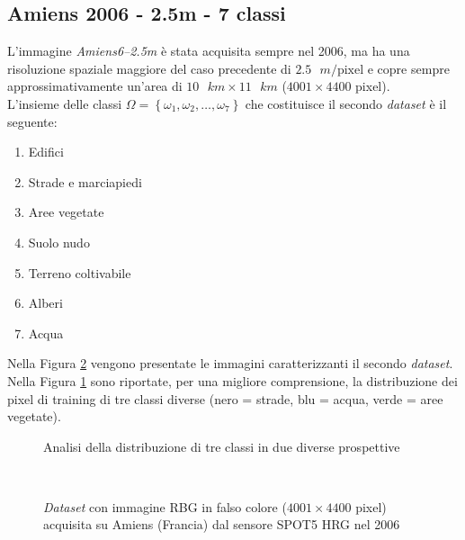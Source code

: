 \subsection{Amiens 2006 - 2.5m - 7 classi}
L'immagine \emph{Amiens6--2.5m} è stata acquisita sempre nel 2006, ma ha una risoluzione  spaziale maggiore del caso precedente di $2.5\text{ }m/\text{pixel}$  e copre sempre approssimativamente un'area di $10\text{ }km\times11\text{ }km$ ($4001\times4400$ pixel).\\
L'insieme delle classi $\Omega=\left\lbrace\omega_1,\omega_2,\ldots,\omega_{7}\right\rbrace$ che costituisce il secondo \emph{dataset} è il seguente:
\begin{enumerate}
\item Edifici
\item Strade e marciapiedi
\item Aree vegetate
\item Suolo nudo
\item Terreno coltivabile
\item Alberi
\item Acqua
\end{enumerate}
Nella Figura \ref{fig: Amiens62_5m} vengono presentate le immagini caratterizzanti il secondo \emph{dataset}. Nella Figura \ref{fig:3classi} sono riportate, per una migliore comprensione, la distribuzione dei pixel di training di tre classi diverse (nero = strade, blu = acqua, verde = aree vegetate).

 \begin{figure}[!ht]
\center  
{}
		
    \caption{Analisi della distribuzione di tre classi in due diverse prospettive}
    \label{fig:3classi}
  \end{figure}


\clearpage

\begin{figure}[!ht]
   \center
   \\%
     \hspace{4mm}
    \caption{\emph{Dataset} con immagine RBG in falso colore ($4001\times4400$ pixel) acquisita su Amiens (Francia) dal sensore \textsc{SPOT5 HRG} nel 2006}
    \label{fig: Amiens62_5m}
  \end{figure}
\clearpage



